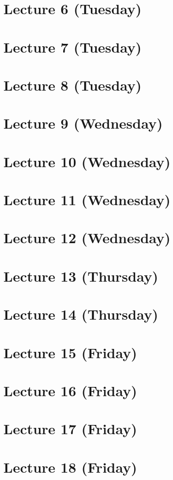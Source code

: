 \documentclass[12pt]{amsart}
\numberwithin{equation}{section}
\theoremstyle{definition}
\numberwithin{figure}{section}
\begin{document}
\section{Lecture 6 (Tuesday)}


\section{Lecture 7 (Tuesday)}


\section{Lecture 8 (Tuesday)}


\section{Lecture 9 (Wednesday)}


\section{Lecture 10 (Wednesday)}


\section{Lecture 11 (Wednesday)}


\section{Lecture 12 (Wednesday)}


\section{Lecture 13 (Thursday)}


\section{Lecture 14 (Thursday)}


\section{Lecture 15 (Friday)}
% 

\section{Lecture 16 (Friday)}
% 

\section{Lecture 17 (Friday)}
% 

\section{Lecture 18 (Friday)}
% 
\end{document}
